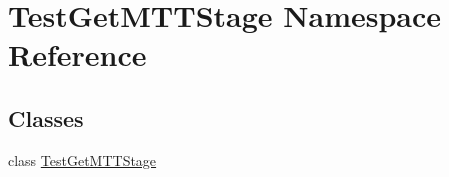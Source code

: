 \hypertarget{namespaceTestGetMTTStage}{\section{Test\-Get\-M\-T\-T\-Stage Namespace Reference}
\label{namespaceTestGetMTTStage}
}
\subsection*{Classes}
\begin{DoxyCompactItemize}
\item 
class \hyperlink{classTestGetMTTStage_1_1TestGetMTTStage}{Test\-Get\-M\-T\-T\-Stage}
\end{DoxyCompactItemize}
